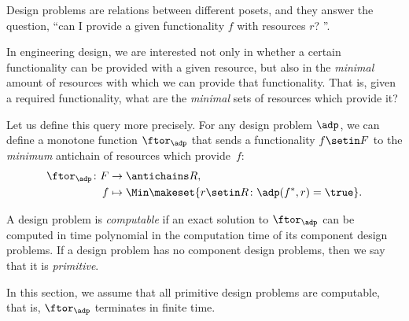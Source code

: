 
\label{sec:computation}

Design problems are relations between different posets, and they answer the question, ``can I provide a given functionality $f$ with resources $r$?
''.

In engineering design, we are interested not only in whether a certain functionality can be provided with a given resource, but also in the \emph{minimal} amount of resources with which we can provide that functionality.
That is, given a required functionality, what are the \emph{minimal} sets of resources which provide it?

Let us define this query more precisely.
For any design problem $\adp$, we can define a monotone function $\ftor_\adp$ that sends a functionality $f \setin F$ to the \emph{minimum} antichain of resources which provide~$f$:
\begin{equation}
    \begin{aligned}
        \ftor_\adp \colon F & \to \antichains R, \\
        f                   & \mapsto \Min \makeset{ r \setin R \colon \adp(f^*, r) = \true }.
    \end{aligned}
\end{equation}

\begin{definition}
    A design problem is \emph{computable} if an exact solution to $\ftor_\adp$ can be computed in time polynomial in the computation time of its component design problems.
    If a design problem has no component design problems, then we say that it is \emph{primitive}.
\end{definition}

In this section, we assume that all primitive design problems are computable, that is, $\ftor_\adp$ terminates in finite time.


